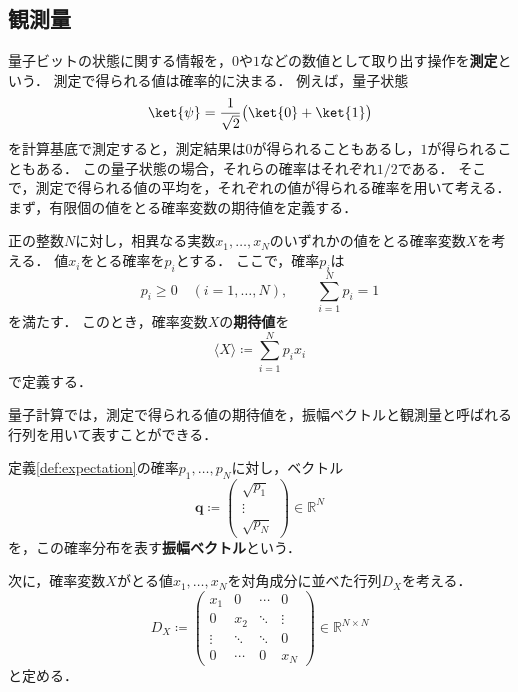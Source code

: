 \subsection{観測量}
\label{subsec:observables}

量子ビットの状態に関する情報を，$0$や$1$などの数値として取り出す操作を\textbf{測定}という．
測定で得られる値は確率的に決まる．
例えば，量子状態
\begin{equation*}
  \ket{\psi}=\frac{1}{\sqrt{2}}\bigl(\ket{0}+\ket{1}\bigr)
\end{equation*}
を計算基底で測定すると，測定結果は$0$が得られることもあるし，$1$が得られることもある．
この量子状態の場合，それらの確率はそれぞれ$1/2$である．
そこで，測定で得られる値の平均を，それぞれの値が得られる確率を用いて考える．
まず，有限個の値をとる確率変数の期待値を定義する．

\begin{defi}[期待値]
\label{def:expectation}
正の整数$N$に対し，相異なる実数$x_1,\ldots,x_N$のいずれかの値をとる確率変数$X$を考える．
値$x_i$をとる確率を$p_i$とする．
ここで，確率$p_i$は
\begin{equation*}
  p_i\geq 0\quad(i=1,\ldots,N),
  \qquad
  \sum_{i=1}^{N}p_i=1
\end{equation*}
を満たす．
このとき，確率変数$X$の\textbf{期待値}を
\begin{equation}
  \langle X\rangle\coloneq\sum_{i=1}^{N}p_i x_i
  \label{eq:expectation-finite-distribution}
\end{equation}
で定義する．
\end{defi}

量子計算では，測定で得られる値の期待値を，振幅ベクトルと観測量と呼ばれる行列を用いて表すことができる．

\begin{defi}[振幅ベクトル]
\label{def:classical-amplitude-vector}
定義\ref{def:expectation}の確率$p_1,\ldots,p_N$に対し，ベクトル
\begin{equation}
  \bm{q}\coloneq
  \begin{pmatrix}
    \sqrt{p_1}\\
    \vdots\\
    \sqrt{p_N}
  \end{pmatrix}
  \in\mathbb R^N
  \label{eq:classical-amplitude-vector}
\end{equation}
を，この確率分布を表す\textbf{振幅ベクトル}という．
\end{defi}

次に，確率変数$X$がとる値$x_1,\ldots,x_N$を対角成分に並べた行列$D_X$を考える．
\begin{equation}
  D_X\coloneq
  \begin{pmatrix}
    x_1 & 0 & \cdots & 0\\
    0 & x_2 & \ddots & \vdots\\
    \vdots & \ddots & \ddots & 0\\
    0 & \cdots & 0 & x_N
  \end{pmatrix}
  \in\mathbb R^{N\times N}
  \label{eq:classical-observable-diagonal-matrix}
\end{equation}
と定める．

